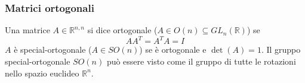     \subsubsection{Matrici ortogonali} \label{subsubsec:matorthogonal}
    Una matrice $A \in \mathbb{R}^{n, n}$ si dice ortogonale ($A \in O(n) \subseteq GL_{n}(\mathbb{R})$) se
    \[
        AA^{T} = A^{T}A = I
    \]
    $A$ è special-ortogonale ($A \in SO(n)$) se è ortogonale e $\det(A) = 1$.
    Il gruppo special-ortogonale $SO(n)$ può essere visto come il gruppo di tutte le rotazioni nello spazio euclideo $\mathbb{R}^{n}$.
